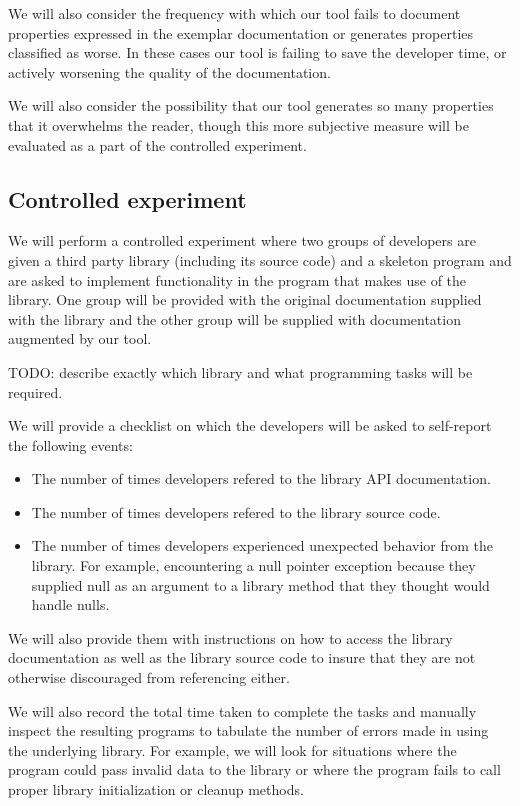 We will also consider the frequency with which our tool fails to document
properties expressed in the exemplar documentation or generates properties
classified as worse. In these cases our tool is failing to save the developer
time, or actively worsening the quality of the documentation.

We will also consider the possibility that our tool generates so many
properties that it overwhelms the reader, though this more subjective measure
will be evaluated as a part of the controlled experiment.

\subsection{Controlled experiment}

We will perform a controlled experiment where two groups of developers are
given a third party library (including its source code) and a skeleton program
and are asked to implement functionality in the program that makes use of the
library. One group will be provided with the original documentation supplied
with the library and the other group will be supplied with documentation
augmented by our tool.

TODO: describe exactly which library and what programming tasks will be
required.

We will provide a checklist on which the developers will be asked to
self-report the following events:

\begin{itemize}
\item The number of times developers refered to the library API documentation.
\item The number of times developers refered to the library source code.
\item The number of times developers experienced unexpected behavior from the
  library. For example, encountering a null pointer exception because they
  supplied null as an argument to a library method that they thought would
  handle nulls.
\end{itemize}

We will also provide them with instructions on how to access the library
documentation as well as the library source code to insure that they are not
otherwise discouraged from referencing either.

We will also record the total time taken to complete the tasks and manually
inspect the resulting programs to tabulate the number of errors made in using
the underlying library. For example, we will look for situations where the
program could pass invalid data to the library or where the program fails to
call proper library initialization or cleanup methods.

